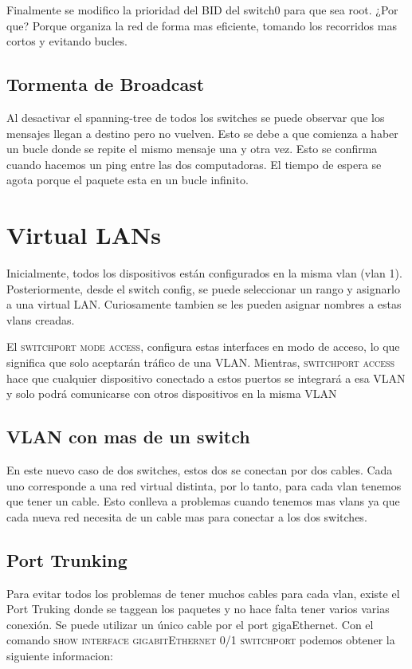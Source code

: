 \documentclass{article}
\begin{document}
Finalmente se modifico la prioridad del BID del switch0 para que sea root. ¿Por que? Porque organiza la red de forma mas eficiente, tomando los recorridos mas cortos y evitando bucles. 

\subsection{Tormenta de Broadcast}

Al desactivar el spanning-tree de todos los switches se puede observar que los mensajes llegan a destino pero no vuelven. Esto se debe a que comienza a haber un bucle donde se repite el mismo mensaje una y otra vez. Esto se confirma cuando hacemos un ping entre las dos computadoras. El tiempo de espera se agota porque el paquete esta en un bucle infinito. 

\section{Virtual LANs}

Inicialmente, todos los dispositivos están configurados en la misma vlan (vlan 1). Posteriormente, desde el switch config, se puede seleccionar un rango y asignarlo a una virtual LAN. Curiosamente tambien se les pueden asignar nombres a estas vlans creadas.

El \textsc{switchport mode access}, configura estas interfaces en modo de acceso, lo que significa que solo aceptarán tráfico de una VLAN. Mientras, \textsc{switchport access} hace que cualquier dispositivo conectado a estos puertos se integrará a esa VLAN y solo podrá comunicarse con otros dispositivos en la misma VLAN

\subsection{VLAN con mas de un switch}
En este nuevo caso de dos switches, estos dos se conectan por dos cables. Cada uno corresponde a una red virtual distinta, por lo tanto, para cada vlan tenemos que tener un cable. Esto conlleva a problemas cuando tenemos mas vlans ya que cada nueva red necesita de un cable mas para conectar a los dos switches. 

\subsection{Port Trunking}
Para evitar todos los problemas de tener muchos cables para cada vlan, existe el Port Truking donde se taggean los paquetes y no hace falta tener varios varias conexión. Se puede utilizar un único cable por el port gigaEthernet. Con el comando \textsc{show interface gigabitEthernet 0/1 switchport} podemos obtener la siguiente informacion:
\end{document}

